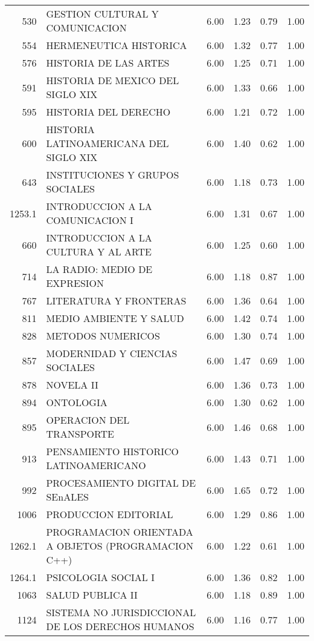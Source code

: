 \begin{table}[ht]
\begin{tabular}{rlrrrr}
  530 & GESTION CULTURAL Y COMUNICACION & 6.00 & 1.23 & 0.79 & 1.00 \\ 
  554 & HERMENEUTICA HISTORICA & 6.00 & 1.32 & 0.77 & 1.00 \\ 
  576 & HISTORIA DE LAS ARTES & 6.00 & 1.25 & 0.71 & 1.00 \\ 
  591 & HISTORIA DE MEXICO DEL SIGLO XIX & 6.00 & 1.33 & 0.66 & 1.00 \\ 
  595 & HISTORIA DEL DERECHO & 6.00 & 1.21 & 0.72 & 1.00 \\ 
  600 & HISTORIA LATINOAMERICANA DEL SIGLO XIX & 6.00 & 1.40 & 0.62 & 1.00 \\ 
  643 & INSTITUCIONES Y GRUPOS SOCIALES & 6.00 & 1.18 & 0.73 & 1.00 \\ 
  1253.1 & INTRODUCCION A LA COMUNICACION I & 6.00 & 1.31 & 0.67 & 1.00 \\ 
  660 & INTRODUCCION A LA CULTURA Y AL ARTE & 6.00 & 1.25 & 0.60 & 1.00 \\ 
  714 & LA RADIO: MEDIO DE EXPRESION & 6.00 & 1.18 & 0.87 & 1.00 \\ 
  767 & LITERATURA Y FRONTERAS & 6.00 & 1.36 & 0.64 & 1.00 \\ 
  811 & MEDIO AMBIENTE Y SALUD & 6.00 & 1.42 & 0.74 & 1.00 \\ 
  828 & METODOS NUMERICOS & 6.00 & 1.30 & 0.74 & 1.00 \\ 
  857 & MODERNIDAD Y CIENCIAS SOCIALES & 6.00 & 1.47 & 0.69 & 1.00 \\ 
  878 & NOVELA II & 6.00 & 1.36 & 0.73 & 1.00 \\ 
  894 & ONTOLOGIA & 6.00 & 1.30 & 0.62 & 1.00 \\ 
  895 & OPERACION DEL TRANSPORTE & 6.00 & 1.46 & 0.68 & 1.00 \\ 
  913 & PENSAMIENTO HISTORICO LATINOAMERICANO & 6.00 & 1.43 & 0.71 & 1.00 \\ 
  992 & PROCESAMIENTO DIGITAL DE SEnALES & 6.00 & 1.65 & 0.72 & 1.00 \\ 
  1006 & PRODUCCION EDITORIAL & 6.00 & 1.29 & 0.86 & 1.00 \\ 
  1262.1 & PROGRAMACION ORIENTADA A OBJETOS (PROGRAMACION C++) & 6.00 & 1.22 & 0.61 & 1.00 \\ 
  1264.1 & PSICOLOGIA SOCIAL I & 6.00 & 1.36 & 0.82 & 1.00 \\ 
  1063 & SALUD PUBLICA II & 6.00 & 1.18 & 0.89 & 1.00 \\ 
  1124 & SISTEMA NO JURISDICCIONAL DE LOS DERECHOS HUMANOS & 6.00 & 1.16 & 0.77 & 1.00 \\ 

\end{tabular}
\end{table}
